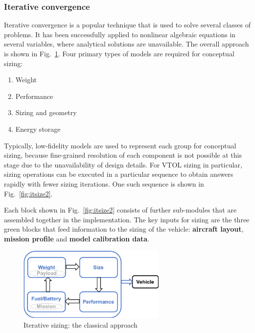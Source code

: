 \subsubsection{Iterative convergence}
Iterative convergence is a popular technique that is used to solve several classes of problems. It has been successfully applied to nonlinear algebraic equations in several variables, where analytical solutions are unavailable. The overall approach is shown in Fig.~\ref{fig:itsize1}. Four primary types of models are required for conceptual sizing:
\begin{enumerate}
\item Weight
\item Performance
\item Sizing and geometry
\item Energy storage
\end{enumerate}

Typically, low-fidelity models are used to represent each group for conceptual sizing, because fine-grained resolution of each component is not possible at this stage due to the unavailability of design details. For VTOL sizing in particular, sizing operations can be executed in a particular sequence to obtain answers rapidly with fewer sizing iterations. One such sequence is shown in Fig.~\ref{fig:itsize2}. 

Each block shown in Fig.~\ref{fig:itsize2} consists of further sub-modules that are assembled together in the implementation. The key inputs for sizing are the three green blocks that feed information to the sizing of the vehicle: \textbf{aircraft layout}, \textbf{mission profile} and \textbf{model calibration data}.

\begin{figure}
\begin{center}
\includegraphics[width=0.65\textwidth]{images/iterate_loop.png}
\caption{Iterative sizing: the classical approach}
\label{fig:itsize1}
\end{center}
\end{figure}


